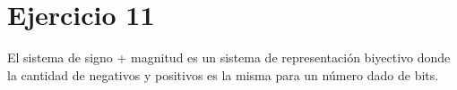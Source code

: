 \section*{Ejercicio 11}

El sistema de signo + magnitud es un sistema de representación biyectivo donde la cantidad de negativos y positivos es la misma para un número dado de bits.